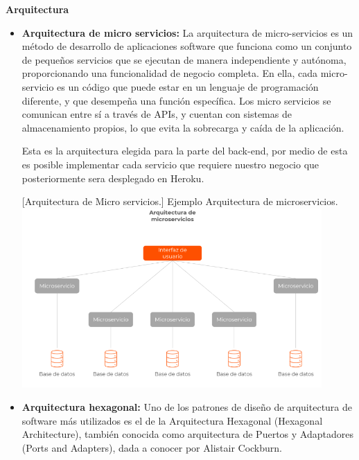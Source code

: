 \vspace{5mm}
\textbf{Arquitectura} 
\begin{itemize}
    
    \item \textbf{Arquitectura de micro servicios: } La arquitectura de micro-servicios es un método de desarrollo de aplicaciones software que funciona como un conjunto de pequeños servicios que se ejecutan de manera independiente y autónoma, proporcionando una funcionalidad de negocio completa. En ella, cada micro-servicio es un código que puede estar en un lenguaje de programación diferente, y que desempeña una función específica. Los micro servicios se comunican entre sí a través de APIs, y cuentan con sistemas de almacenamiento propios, lo que evita la sobrecarga y caída de la aplicación.
    
    Esta es la arquitectura elegida para la parte del back-end, por medio de esta es posible implementar cada servicio que requiere nuestro negocio que posteriormente sera desplegado en Heroku.
    
     \vspace{2mm}
     \begin{minipage}{0.9\textwidth}
        \centering
        [{Arquitectura de Micro servicios.}]{ Ejemplo Arquitectura de microservicios. }
        \label{microservicios}
         \includegraphics[width=0.9\textwidth]{Images/microservicios.png}
    \end{minipage}
    
    \item \textbf{Arquitectura hexagonal: }Uno de los patrones de diseño de arquitectura de software más utilizados es el de la Arquitectura Hexagonal (Hexagonal Architecture), también conocida como arquitectura de Puertos y Adaptadores (Ports and Adapters), dada a conocer por Alistair Cockburn.


\end{itemize}
